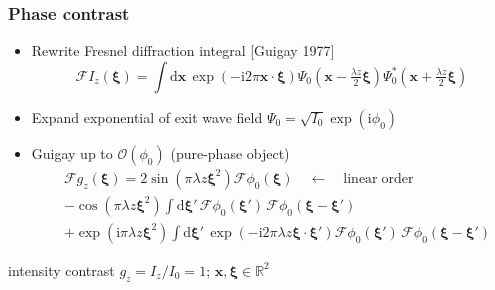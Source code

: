 \documentclass{beamer}
\renewcommand{\vec}{\mathbold}
\newcommand{\vecx}{\vec{x}}
\newcommand{\vecxi}{\vec{\xi}}
\newcommand{\order}{\mathcal{O}}
\newcommand{\R}{\mathbb{R}}
\newcommand{\ii}{\mathrm{i}}
\newcommand{\F}{\mathcal{F}}
\newcommand{\ft}[1]{\widehat{#1}}
\newcommand{\Intd}[1]{\!\mathrm{d}#1\,}
\newcommand{\expp}[1]{\exp\left(#1\right)}
\newcommand{\sref}[1]{{\scriptsize [#1]}}
\newcommand{\flr}[1]{\begin{flushright}{#1}\end{flushright}}
\begin{document}
\begin{frame}
  \frametitle{Phase contrast}
  \begin{itemize}
  \item Rewrite Fresnel diffraction integral \sref{Guigay 1977}
    \begin{equation*}
    \F I_z(\vecxi) = 
    \int \Intd{\vecx}\exp{(-\ii 2\pi\vecx\cdot\vecxi)} 
    \Psi_0\left(\vecx-\tfrac{\lambda z}{2}\vecxi\right) 
    \Psi^*_0\left(\vecx+\tfrac{\lambda z}{2}\vecxi\right)
  \end{equation*}
  \item Expand exponential of exit wave field
    $\Psi_0=\sqrt{I_0}\expp{\ii\phi_0}$
  \item Guigay up to $\order(\phi_0)$ (pure-phase object)
    \begin{equation*}
      \begin{split}
        &\F g_z(\vecxi) =
        2\sin(\pi\lambda z\vecxi^2)\F \phi_0(\vecxi) 
        \quad \leftarrow \quad \mathrm{linear\;order}
        \\ & -\cos(\pi\lambda z\vecxi^2)\int\Intd{\vecxi'}
        \F\phi_0(\vecxi')\,\F\phi_0(\vecxi-\vecxi')
        \\ & +\expp{\ii\pi\lambda z\vecxi^2}\int\Intd{\vecxi'}
        \expp{-\ii 2\pi\lambda z\vecxi\cdot\vecxi'} 
        \F\phi_0(\vecxi')\,\F\phi_0(\vecxi-\vecxi')
      \end{split}
    \end{equation*}
  \end{itemize}
  \flr{intensity contrast $g_z=I_z/I_0=1$; $\vecx,\vecxi \in \R^2$}
\end{frame}
\end{document}
